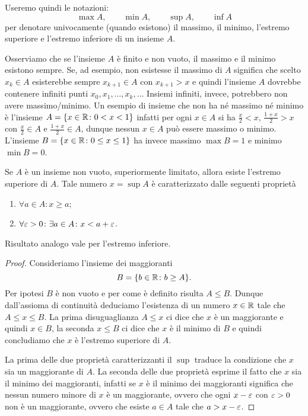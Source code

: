 Useremo quindi le notazioni:
\mynote{$\max$ $\min$ $\sup$ $\inf$}%
%
%
%
%
\index{$\sup$}%
\index{$\inf$}%
\index{$\max$}%
\index{$\min$}%
\[
 \max A, \qquad
 \min A, \qquad
 \sup A, \qquad
 \inf A
\]
per denotare univocamente (quando esistono) il massimo, il minimo,
l'estremo superiore e l'estremo inferiore di un insieme $A$.

Osserviamo che se l'insieme $A$ è finito e non vuoto,
il massimo e il minimo esistono
sempre.
Se, ad esempio, non esistesse il massimo di $A$ significa che scelto
$x_k\in A$ esisterebbe sempre $x_{k+1}\in A$ con $x_{k+1} > x$ e quindi l'insieme
$A$ dovrebbe contenere infiniti punti $x_0,x_1, \dots, x_k,\dots $
Insiemi infiniti, invece, potrebbero non avere massimo/minimo.
Un esempio di insieme che non ha né massimo né minimo è
l'insieme $A = {\left\{ x\in \mathbb R\colon 0<x<1 \right\}}$ infatti per ogni
$x\in A$ si ha $\frac x 2<x$, $\frac{1+x}{2}>x$
con $\frac x 2\in A$ e $\frac{1+x}{2}\in A$,
dunque nessun $x\in A$ può essere
massimo o minimo. L'insieme $B={\left\{ x\in \mathbb R \colon 0\le x \le 1 \right\}}$
ha invece massimo $\max B= 1$ e minimo $\min B=0$.

\begin{theorem}
\label{th:sup}
\mymark{**}
Se $A$ è un insieme non vuoto,
superiormente limitato, allora esiste l'estremo superiore di $A$.
Tale numero $x=\sup A$ è caratterizzato dalle seguenti proprietà
\begin{enumerate}
\item $\forall a\in A\colon x \ge a$;
\item $\forall \varepsilon>0\colon \exists a\in A \colon x < a + \varepsilon$.
\end{enumerate}

Risultato analogo vale per l'estremo inferiore.
\end{theorem}
%
\begin{proof}
\mymark{*}
Consideriamo l'insieme dei maggioranti
\[
B = {\left\{  b\in \mathbb R \colon b \ge A \right\}}.
\]
Per ipotesi $B$ è non vuoto e per come è definito risulta $A\le B$.
Dunque dall'assioma di continuità deduciamo l'esistenza di un numero $x\in \mathbb R$
tale che $A\le x \le B$. La prima disuguaglianza $A\le x$ ci dice che $x$ è un
maggiorante e quindi $x\in B$, la seconda $x\le B$ ci dice che $x$ è il minimo
di $B$ e quindi concludiamo che $x$ è l'estremo superiore di $A$.

La prima delle due proprietà caratterizzanti il $\sup$ traduce la condizione
che $x$ sia un maggiorante di $A$. La seconda delle due proprietà esprime il
fatto che $x$ sia il minimo dei maggioranti, infatti se $x$ è il minimo
dei maggioranti significa che nessun numero minore di $x$ è un maggiorante, ovvero
che ogni $x-\varepsilon$ con $\varepsilon>0$ non è un maggiorante, ovvero
che esiste $a\in A$ tale che $a > x-\varepsilon$.
\end{proof}

